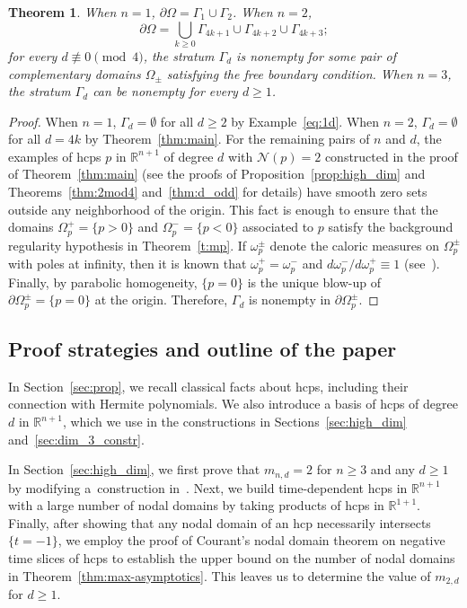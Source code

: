\documentclass[10pt]{amsart}
\newtheorem{theo}{Theorem}[section]
\theoremstyle{definition}\newtheorem{defi}[theo]{Definition}\newtheorem{rema}[theo]{Remark}\newtheorem{exam}[theo]{Example}\newtheorem{exem}[theo]{Example}\newtheorem{nota}[theo]{Notation}
\newcommand{\R}{\mathbb{R}}
\newcommand{\nodal}{\mathcal{N}}
\begin{document}
\begin{theo}
When $n=1$, {$\partial\Omega=\Gamma_1 \cup \Gamma_2$}. When $n=2$,
\begin{equation}
\partial\Omega=\bigcup_{k\geq 0} \Gamma_{4k+1}\cup\Gamma_{4k+2}\cup\Gamma_{4k+3};
\end{equation}
for every $d\not\equiv 0\pmod 4$, the stratum $\Gamma_d$ is nonempty for some pair of {complementary domains $\Omega_{\pm}$} {satisfying} the free boundary condition. When $n=3$, the stratum $\Gamma_d$ can be nonempty for every $d\geq 1$.
\end{theo}

\begin{proof}
When $n=1$, $\Gamma_d=\emptyset$ for all $d\geq 2$ by Example~\ref{eq:1d}. When $n=2$, $\Gamma_d=\emptyset$ for all $d=4k$ by Theorem~\ref{thm:main}. For the remaining pairs of $n$ and $d$, the examples of hcps $p$ in $\R^{n+1}$ of degree $d$ with $\nodal(p)=2$ constructed in the proof of Theorem~\ref{thm:main} (see the proofs of Proposition~\ref{prop:high_dim} and Theorems~\ref{thm:2mod4} and~\ref{thm:d_odd} for details) have smooth zero sets outside any neighborhood of the origin. This fact is enough to ensure that the domains $\Omega_p^+=\{p>0\}$ and $\Omega_p^-=\{p<0\}$ associated to $p$ satisfy the background regularity hypothesis in Theorem~\ref{t:mp}. If $\omega_p^\pm$ denote the caloric measures on $\Omega_p^\pm$ with poles at infinity, then it is known that $\omega_p^+=\omega_p^-$ and $d\omega_p^-/d\omega_p^+\equiv 1$ (see~\cite[Section~6]{MP21}). Finally, by parabolic homogeneity, $\{p=0\}$ is the unique blow-up of $\partial\Omega_p^\pm=\{p=0\}$ at the origin. Therefore, $\Gamma_d$ is nonempty in $\partial\Omega^\pm_p$.
\end{proof}

\subsection{Proof strategies and outline of the paper} \label{ss:organize}


In Section~\ref{sec:prop}, we recall classical facts about hcps, including their connection with Hermite polynomials. We also introduce a basis of hcps of degree $d$ in $\R^{n+1}$, which we use in the constructions in Sections~\ref{sec:high_dim} and~\ref{sec:dim_3_constr}.

In Section~\ref{sec:high_dim}, we first prove that $m_{n,d} = 2$ for $n \ge 3$ and any $d \ge 1$ by modifying a~construction in~\cite{BET17}. Next, we build time-dependent hcps in $\R^{n+1}$ with a large number of nodal domains by taking products of hcps in $\R^{1+1}$. Finally, after showing that any nodal domain of an hcp necessarily intersects $\{t=-1\}$, we employ the proof of Courant's nodal domain theorem on negative time slices of hcps to establish the upper bound on the number of nodal domains in Theorem~\ref{thm:max-asymptotics}. This leaves us to determine the value of $m_{2,d}$ for $d \ge 1$.
\end{document}
